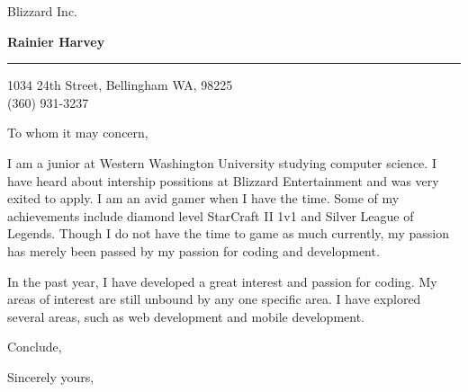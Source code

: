 \documentclass{letter} %
\begin{document}
\signature{%
Rainier Harvey}           %
\longindentation=0pt                       %
\let\raggedleft\raggedright                %
 
 
\begin{letter}{Blizzard Inc. \\}


\begin{flushleft}
{\large\bf Rainier Harvey}
\end{flushleft}
\medskip\hrule height 1pt
\begin{flushright}
\hfill 1034 24th Street, Bellingham WA, 98225\\
\hfill (360) 931-3237 
\end{flushright} 
\vfill %

 
\opening{To whom it may concern,} 
 
\noindent I am a junior at Western Washington University studying computer science. I have heard about intership possitions at Blizzard Entertainment and was very exited to apply. 
I am an avid gamer when I have the time. Some of my achievements include diamond level StarCraft II 1v1 and Silver League of Legends. Though I do not have the time to game as much currently, 
my passion has merely been passed by my passion for coding and development.
 
\noindent In the past year, I have developed a great interest and passion for coding. My areas of interest are still unbound by any one specific area. I have explored several areas, 
such as web development and mobile development. 
 
\noindent Conclude, 
 
\closing{Sincerely yours,} 

 
\end{letter}
 
\end{document}
